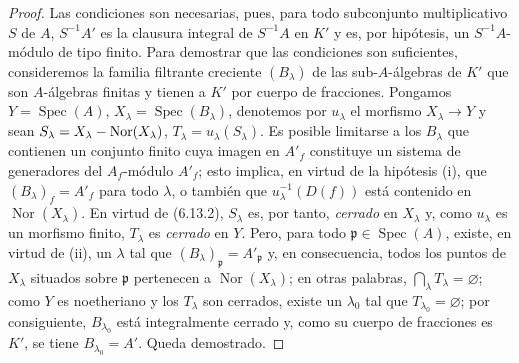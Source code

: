 \begin{proof}
Las condiciones son necesarias, pues, para todo subconjunto
multiplicativo $S$ de $A$, $S^{-1}A'$ es la clausura integral de
$S^{-1}A$ en $K'$ y es, por hipótesis, un $S^{-1}A$-módulo de tipo
finito. Para demostrar que las condiciones son suficientes, consideremos
la familia filtrante creciente $(B_\lambda)$ de las sub-$A$-álgebras
de $K'$ que son $A$-álgebras finitas y tienen a $K'$ por cuerpo de
fracciones. Pongamos $Y=\operatorname{Spec}(A)$,
$X_\lambda=\operatorname{Spec}(B_\lambda)$, denotemos por $u_\lambda$ el
morfismo $X_\lambda\to Y$ y sean
$S_\lambda=X_\lambda-\operatorname{Nor}(X_\lambda)$,
$T_\lambda=u_\lambda(S_\lambda)$. Es posible limitarse a los $B_\lambda$
que contienen un conjunto finito cuya imagen en $A'_f$ constituye un
sistema de generadores del $A_f$-módulo $A'_f$; esto implica, en virtud
de la hipótesis (i), que $(B_\lambda)_f=A'_f$ para todo $\lambda$, o
también que $u_\lambda^{-1}(D(f))$ está contenido en
$\operatorname{Nor}(X_\lambda)$. En virtud de (6.13.2), $S_\lambda$ es,
por tanto, \emph{cerrado} en $X_\lambda$ y, como $u_\lambda$ es un morfismo
finito, $T_\lambda$ es \emph{cerrado} en $Y$. Pero, para todo
$\mathfrak p\in\operatorname{Spec}(A)$, existe, en virtud de (ii), un
$\lambda$ tal que $(B_\lambda)_\mathfrak p=A'_\mathfrak p$ y, en
consecuencia, todos los puntos
de $X_\lambda$ situados sobre $\mathfrak p$ pertenecen a
$\operatorname{Nor}(X_\lambda)$; en otras palabras,
$\bigcap_\lambda T_\lambda=\varnothing$; como $Y$ es noetheriano y los
$T_\lambda$ son cerrados, existe un $\lambda_0$ tal que
$T_{\lambda_0}=\varnothing$; por consiguiente, $B_{\lambda_0}$ está
integralmente cerrado y, como su cuerpo de fracciones es $K'$, se
tiene $B_{\lambda_0}=A'$. Queda demostrado.
\end{proof}
